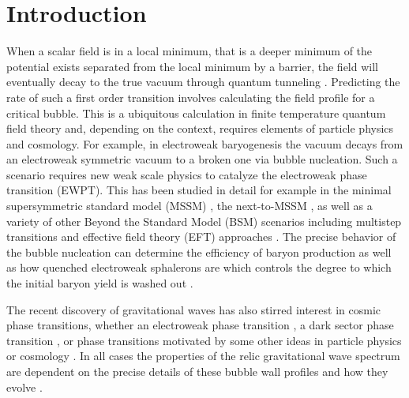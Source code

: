 \documentclass[final,3p,11pt,pdflatex]{elsarticle}
\begin{document}
\section{Introduction}
\label{sec:intro}
When a scalar field is in a local minimum, that is a deeper minimum of the potential exists separated from the local minimum by a barrier, the field will
eventually decay to the true vacuum through quantum tunneling
\cite{Coleman:1977py,Callan:1977pt,Linde:1980tt}.  Predicting the rate of such
a first order transition involves calculating the field profile for a critical
bubble.  This is a ubiquitous calculation in finite temperature quantum field
theory and, depending on the context, requires elements of particle physics and cosmology.  For
example, in electroweak baryogenesis \cite{Morrissey:2012db,White:2016nbo,
  Das:2000ft} the vacuum decays from an electroweak symmetric vacuum to a
broken one via bubble nucleation. Such a scenario requires new weak scale
physics to catalyze the electroweak phase transition (EWPT).  This has been
studied in detail for example in the minimal supersymmetric standard model
(MSSM) \cite{Lee:2004we,Balazs:2004ae,Carena:2008vj,Carena:2012np,
  Liebler:2015ddv,Huber:2001xf,Huber:2006ma}, the next-to-MSSM
\cite{Menon:2004wv,Balazs:2013cia,Akula:2017yfr,Davies:1996qn,Huber:2006wf,
  Kozaczuk:2014kva,Huber:2006ma,Bian:2017wfv}, as well as a variety of other
Beyond the Standard Model (BSM) scenarios including multistep transitions
\cite{Ramsey-Musolf:2017tgh,Inoue:2015pza,Patel:2013zla} and  effective field
theory (EFT) approaches \cite{Balazs:2016yvi,deVries:2017ncy,Grojean:2004xa}.
The precise behavior of the bubble nucleation can determine the efficiency of
baryon production \cite{Balazs:2016yvi} as well as how quenched electroweak
sphalerons are which controls the degree to which the initial baryon yield is
washed out \cite{Patel:2011th}.

The recent discovery of gravitational waves \cite{Abbott:2016blz} has also
stirred interest in cosmic phase transitions, whether an electroweak phase
transition \cite{Croon:2018new,Hashino:2018zsi,Chala:2018ari,Chen:2017cyc,
  Kang:2017mkl,Iso:2017uuu,Kobakhidze:2017mru,Beniwal:2017eik,Chao:2017vrq},
a dark sector phase transition \cite{Schwaller:2015tja,Shelton:2010ta,
  Chowdhury:2011ga}, or phase transitions motivated by some other ideas in
particle physics or cosmology \cite{Huber:2007vva,Balazs:2016tbi,
  Kamionkowski:1993fg,Apreda:2001us,Caprini:2007xq,Hindmarsh:2013xza,
  Caprini:2009fx,Espinosa:2010hh,Binetruy:2012ze,Wan:2018udw,Mazumdar:2018dfl}.
In all cases the properties of the relic gravitational wave spectrum are
dependent on the precise details of these bubble wall profiles and how they
evolve \cite{Huber:2008hg,Hindmarsh:2017gnf,Jinno:2017fby,Hindmarsh:2016lnk,
  Konstandin:2017sat,Weir:2017wfa}.
\end{document}
